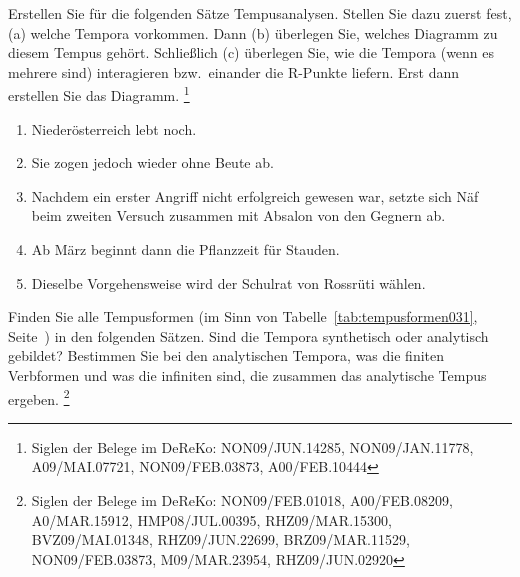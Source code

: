 \Uebungen

\begin{sloppypar}

 \label{exc:verbalflexion01} Erstellen Sie für die folgenden Sätze Tempusanalysen.
Stellen Sie dazu zuerst fest, (a) welche Tempora vorkommen.
Dann (b) überlegen Sie, welches Diagramm zu diesem Tempus gehört.
Schließlich (c) überlegen Sie, wie die Tempora (wenn es mehrere sind) interagieren bzw.\ einander die R-Punkte liefern.
Erst dann erstellen Sie das Diagramm.
\footnote{Siglen der Belege im DeReKo: NON09\slash JUN.14285, NON09\slash JAN.11778, A09\slash MAI.07721, NON09\slash FEB.03873, A00\slash FEB.10444}

\begin{enumerate}
  \item Niederösterreich lebt noch.
  \item Sie zogen jedoch wieder ohne Beute ab.
  \item Nachdem ein erster Angriff nicht erfolgreich gewesen war, setzte sich Näf beim zweiten Versuch zusammen mit Absalon von den Gegnern ab.
  \item Ab März beginnt dann die Pflanzzeit für Stauden.
  \item Dieselbe Vorgehensweise wird der Schulrat von Rossrüti wählen.
\end{enumerate}

 \label{exc:verbalflexion02} Finden Sie alle Tempusformen (im Sinn von Tabelle~\ref{tab:tempusformen031}, Seite~\pageref{tab:tempusformen031}) in den folgenden Sätzen.
Sind die Tempora synthetisch oder analytisch gebildet?
Bestimmen Sie bei den analytischen Tempora, was die finiten Verbformen und was die infiniten sind, die zusammen das analytische Tempus ergeben.%
\footnote{Siglen der Belege im DeReKo: NON09\slash FEB.01018, A00\slash FEB.08209, A0\slash MAR.15912, HMP08\slash JUL.00395, RHZ09\slash MAR.15300, BVZ09\slash MAI.01348, RHZ09\slash JUN.22699, BRZ09\slash MAR.11529, NON09\slash FEB.03873, M09\slash MAR.23954, RHZ09\slash JUN.02920}


\end{sloppypar}
